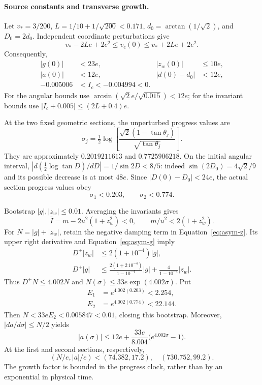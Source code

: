 \paragraph{Source constants and transverse growth.}
Let $v_*=3/200$, $L=1/10+1/\sqrt{200}<0.171$, $d_0=\arctan(1/\sqrt2)$, and $D_0=2d_0$. Independent coordinate perturbations give
\begin{equation}
 v_*-2Le+2e^2\le v_c(0)\le v_*+2Le+2e^2.
\end{equation}
Consequently,
\begin{align}
 |g(0)|&<23e,& |z_w(0)|&\le10e,\\
 |a(0)|&<12e,& |d(0)-d_0|&<12e,
 \label{eq:asym-source}\\
 -0.005006&<I_c<-0.004994<0.\nonumber
\end{align}
For the angular bounds use
$\arcsin(\sqrt2e/\sqrt{0.015})<12e$; for the invariant bounds use
$|I_c+0.005|\le(2L+0.4)e$.

At the two fixed geometric sections, the unperturbed progress values are
\begin{equation}
 \bar\sigma_j=\tfrac12\log\left[
 \frac{\sqrt2(1-\tan\theta_j)}{\sqrt{\tan\theta_j}}\right].
\end{equation}
They are approximately $0.2019211613$ and $0.7725906218$. On the initial angular interval,
$|d(\tfrac12\log\tan D)/dD|=1/\sin2D<8/5$:
indeed $\sin(2D_0)=4\sqrt2/9$ and its possible decrease is at most $48e$.
Since $|D(0)-D_0|<24e$, the actual section progress values obey
\begin{equation}
 \sigma_1<0.203,\qquad \sigma_2<0.774.
 \label{eq:asym-section-progress}
\end{equation}

Bootstrap $|g|,|z_w|\le0.01$. Averaging the invariants gives
\begin{equation}
 \bar I=m-2u^2(1+z_w^2)<0,\qquad m/u^2<2(1+z_w^2).
\end{equation}
For $N=|g|+|z_w|$, retain the negative damping term in Equation~\eqref{eq:asym-z}. Its upper right derivative and Equation~\eqref{eq:asym-g} imply
\begin{align}
 D^+|z_w|&\le2(1+10^{-4})|g|,\\
 D^+|g|&\le\frac{2(1+2\,10^{-4})}{1-10^{-4}}|g|
              +\frac4{1-10^{-4}}|z_w|.
\end{align}
Thus $D^+N\le4.002N$ and $N(\sigma)\le33e\exp(4.002\sigma)$. Put
\begin{align}
 E_1&=e^{4.002(0.203)}<2.254,\\
 E_2&=e^{4.002(0.774)}<22.144.
\end{align}
Then $N<33eE_2<0.005847<0.01$, closing this bootstrap. Moreover, $|da/d\sigma|\le N/2$ yields
\begin{equation}
 |a(\sigma)|\le12e+\frac{33e}{8.004}
                      \big(e^{4.002\sigma}-1\big).
 \label{eq:asym-rotation-bound}
\end{equation}
At the first and second sections, respectively,
\begin{equation}
 (N/e,|a|/e)<(74.382,17.2),\quad(730.752,99.2).
 \label{eq:asym-end-bounds}
\end{equation}
The growth factor is bounded in the progress clock, rather than by an exponential in physical time.

